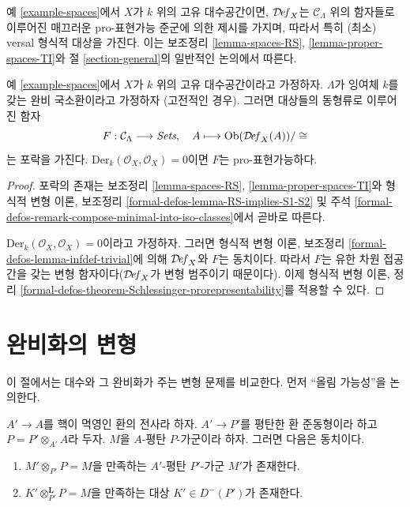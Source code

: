 \noindent
예 \ref{example-spaces}에서 $X$가 $k$ 위의 고유 대수공간이면,
$\mathcal{D}\!\mathit{ef}_X$는 $\mathcal{C}_\Lambda$ 위의 함자들로 이루어진
매끄러운 pro-표현가능 준군에 의한 제시를 가지며, 따라서 특히
(최소) versal 형식적 대상을 가진다. 이는 보조정리
\ref{lemma-spaces-RS}, \ref{lemma-proper-spaces-TI}와
절 \ref{section-general}의 일반적인 논의에서 따른다.

\begin{lemma}
\label{lemma-spaces-hull}
예 \ref{example-spaces}에서 $X$가 $k$ 위의 고유 대수공간이라고 가정하자.
$\Lambda$가 잉여체 $k$를 갖는 완비 국소환이라고 가정하자
(고전적인 경우). 그러면 대상들의 동형류로 이루어진 함자
$$
F : \mathcal{C}_\Lambda \longrightarrow \textit{Sets},\quad
A \longmapsto \mathop{\mathrm{Ob}}\nolimits(\mathcal{D}\!\mathit{ef}_X(A))/\cong
$$
는 포락을 가진다. $\text{Der}_k(\mathcal{O}_X, \mathcal{O}_X) = 0$이면
$F$는 pro-표현가능하다.
\end{lemma}

\begin{proof}
포락의 존재는 보조정리 \ref{lemma-spaces-RS},
\ref{lemma-proper-spaces-TI}와 형식적 변형 이론, 보조정리
\ref{formal-defos-lemma-RS-implies-S1-S2} 및 주석
\ref{formal-defos-remark-compose-minimal-into-iso-classes}에서 곧바로 따른다.

\medskip\noindent
$\text{Der}_k(\mathcal{O}_X, \mathcal{O}_X) = 0$이라고 가정하자. 그러면
형식적 변형 이론, 보조정리 \ref{formal-defos-lemma-infdef-trivial}에 의해
$\mathcal{D}\!\mathit{ef}_X$와 $F$는 동치이다. 따라서 $F$는 유한 차원
접공간을 갖는 변형 함자이다($\mathcal{D}\!\mathit{ef}_X$가 변형 범주이기
때문이다). 이제 형식적 변형 이론, 정리
\ref{formal-defos-theorem-Schlessinger-prorepresentability}를 적용할 수 있다.
\end{proof}





\section{완비화의 변형}
\label{section-compare}

\noindent
이 절에서는 대수와 그 완비화가 주는 변형 문제를 비교한다. 먼저
``올림 가능성''을 논의한다.

\begin{lemma}
\label{lemma-lift-equivalence-module-derived}
$A' \to A$를 핵이 멱영인 환의 전사라 하자. $A' \to P'$를 평탄한 환
준동형이라 하고 $P = P' \otimes_{A'} A$라 두자. $M$을 $A$-평탄
$P$-가군이라 하자. 그러면 다음은 동치이다.
\begin{enumerate}
\item $M' \otimes_{P'} P = M$을 만족하는 $A'$-평탄 $P'$-가군 $M'$가
존재한다.
\item $K' \otimes_{P'}^\mathbf{L} P = M$을 만족하는 대상
$K' \in D^-(P')$가 존재한다.
\end{enumerate}
\end{lemma}


